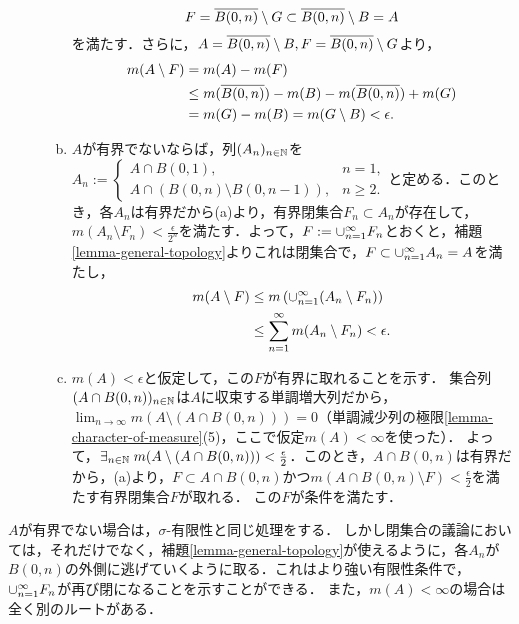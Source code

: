 \documentclass[uplatex, dvipdfmx]{jsreport}
\begin{document}
\begin{Proof}
\begin{description}
\begin{enumerate}[(a)]
            \[F=\overline{B(0,n)}\setminus G\subset\overline{B(0,n)}\setminus B=A\]
            を満たす．さらに，$A=\overline{B(0,n)}\setminus B,F=\overline{B(0,n)}\setminus G$より，
            \begin{align*}
                m(A\setminus F)&=m(A)-m(F)\\
                &\le m(\overline{B(0,n)})-m(B)-m(\overline{B(0,n)})+m(G)\\
                &=m(G)-m(B)=m(G\setminus B)<\epsilon.
            \end{align*}
            \item $A$が有界でないならば，列$(A_n)_{n\in\mathbb{N}}$を$A_n:=\begin{cases}
                A\cap B(0,1),&n=1,\\
                A\cap (B(0,n)\setminus B(0,n-1)),&n\ge 2.
            \end{cases}$と定める．このとき，各$A_n$は有界だから(a)より，有界閉集合$F_n\subset A_n$が存在して，$m(A_n\setminus F_n)<\frac{\epsilon}{2^n}$を満たす．よって，$F:=\cup_{n=1}^\infty F_n$とおくと，補題\ref{lemma-general-topology}よりこれは閉集合で，$F\subset\cup_{n=1}^\infty A_n=A$を満たし，
            \begin{align*}
                m(A\setminus F)&\le m\left(\cup_{n=1}^\infty(A_n\setminus F_n)\right)\\
                &\le\sum_{n=1}^\infty m(A_n\setminus F_n)<\epsilon.
            \end{align*}
            \item $m(A)<\epsilon$と仮定して，この$F$が有界に取れることを示す．
            集合列$(A\cap B(0,n))_{n\in\mathbb{N}}$は$A$に収束する単調増大列だから，$\lim_{n\to\infty}m(A\setminus(A\cap B(0,n)))=0$（単調減少列の極限\ref{lemma-character-of-measure}(5)，ここで仮定$m(A)<\infty$を使った）．
            よって，$\exists_{n\in\mathbb{N}}\;m(A\setminus (A\cap B(0,n)))<\frac{\epsilon}{2}$．このとき，$A\cap B(0,n)$は有界だから，(a)より，$F\subset A\cap B(0,n)$かつ$m(A\cap B(0,n)\setminus F)<\frac{\epsilon}{2}$を満たす有界閉集合$F$が取れる．
            この$F$が条件を満たす．
        \end{enumerate}
    \end{description}
\end{Proof}
\begin{remarks}
    $A$が有界でない場合は，$\sigma$-有限性と同じ処理をする．
    しかし閉集合の議論においては，それだけでなく，補題\ref{lemma-general-topology}が使えるように，各$A_n$が$B(0,n)$の外側に逃げていくように取る．これはより強い有限性条件で，$\cup_{n=1}^\infty F_n$が再び閉になることを示すことができる．
    また，$m(A)<\infty$の場合は全く別のルートがある．
\end{remarks}
\end{document}
